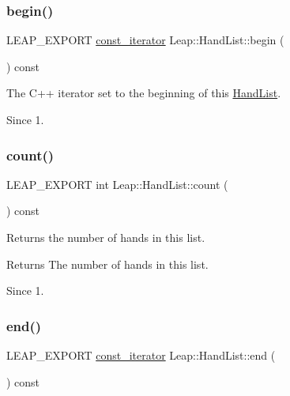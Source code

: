 \subsubsection{\texorpdfstring{begin()}{begin()}}
{\footnotesize\ttfamily L\+E\+A\+P\+\_\+\+E\+X\+P\+O\+RT \hyperlink{class_leap_1_1_hand_list_a9c35a4db8fd94a3b1a029efecbd13668}{const\+\_\+iterator} Leap\+::\+Hand\+List\+::begin (\begin{DoxyParamCaption}{ }\end{DoxyParamCaption}) const}

The C++ iterator set to the beginning of this \hyperlink{class_leap_1_1_hand_list}{Hand\+List}.


\begin{DoxyCodeInclude}
\end{DoxyCodeInclude}


\begin{DoxySince}{Since}
1. 
\end{DoxySince}
\mbox{\label{class_leap_1_1_hand_list_a91ac67ed01b575c7b3ef76486505105f}} 
\subsubsection{\texorpdfstring{count()}{count()}}
{\footnotesize\ttfamily L\+E\+A\+P\+\_\+\+E\+X\+P\+O\+RT int Leap\+::\+Hand\+List\+::count (\begin{DoxyParamCaption}{ }\end{DoxyParamCaption}) const}

Returns the number of hands in this list.


\begin{DoxyCodeInclude}
\end{DoxyCodeInclude}
 \begin{DoxyReturn}{Returns}
The number of hands in this list. 
\end{DoxyReturn}
\begin{DoxySince}{Since}
1. 
\end{DoxySince}
\mbox{\label{class_leap_1_1_hand_list_a9a975bb7abeb64e1bccb3d2ce32bc07b}} 
\subsubsection{\texorpdfstring{end()}{end()}}
{\footnotesize\ttfamily L\+E\+A\+P\+\_\+\+E\+X\+P\+O\+RT \hyperlink{class_leap_1_1_hand_list_a9c35a4db8fd94a3b1a029efecbd13668}{const\+\_\+iterator} Leap\+::\+Hand\+List\+::end (\begin{DoxyParamCaption}{ }\end{DoxyParamCaption}) const}

